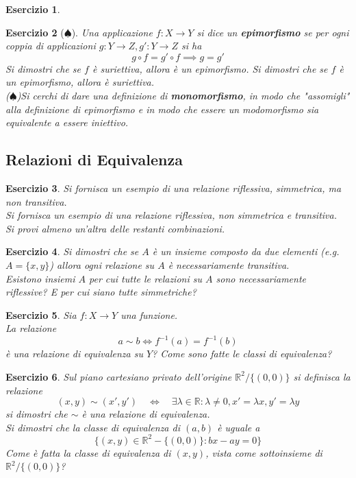 \documentclass{article}
\newtheorem{es}{Esercizio}
\begin{document}
{\begin{es}
\end{es}


\begin{es}[$\spadesuit$]
    Una applicazione $f:X\to Y$ si dice un \textbf{epimorfismo} se per ogni coppia di applicazioni $g:Y\to Z, g':Y\to Z$ si ha $$g\circ f=g'\circ f\implies g=g'$$
    Si dimostri che se $f$ è suriettiva, allora è un epimorfismo. Si dimostri che se $f$ è un epimorfismo, allora è suriettiva.\\
    ($\spadesuit$)Si cerchi di dare una definizione di \textbf{monomorfismo}, in modo che "assomigli" alla definizione di epimorfismo e in modo che essere un modomorfismo sia equivalente a essere iniettivo.
\end{es}






\subsection{Relazioni di Equivalenza}





\begin{es}
    Si fornisca un esempio di una relazione riflessiva, simmetrica, ma non transitiva.\\
    Si fornisca un esempio di una relazione riflessiva, non simmetrica e transitiva.\\
    Si provi almeno un'altra delle restanti combinazioni.
\end{es}



\begin{es}
    Si dimostri che se $A$ è un insieme composto da due elementi (e.g. $A=\{x,y\}$) allora ogni relazione su $A$ è necessariamente transitiva.\\
    Esistono insiemi $A$ per cui tutte le relazioni su $A$ sono necessariamente riflessive? E per cui siano tutte simmetriche? 
\end{es}



\begin{es}
    Sia $f:X\to Y$ una funzione.\\
    La relazione $$a\sim b\iff f^{-1}(a)=f^{-1}(b)$$ è una relazione di equivalenza su $Y$? Come sono fatte le classi di equivalenza?\\
\end{es}


\begin{es}
    Sul piano cartesiano privato dell'origine $\mathbb{R}^2/\{(0,0)\}$
    si definisca la relazione 
    $$(x,y)\sim (x',y')\quad \iff \quad \exists \lambda\in\mathbb{R}:\lambda\neq 0,x'=\lambda x,y'=\lambda y$$
    si dimostri che $\sim$ è una relazione di equivalenza.\\
    Si dimostri che la classe di equivalenza di $(a,b)$ è uguale a
    $$\{(x,y)\in \mathbb{R}^2-\{(0,0)\}: bx-ay=0\}$$
    Come è fatta la classe di equivalenza di $(x,y)$, vista come sottoinsieme di $\mathbb{R}^2/\{(0,0)\}$?
\end{es}



}
\end{document}
